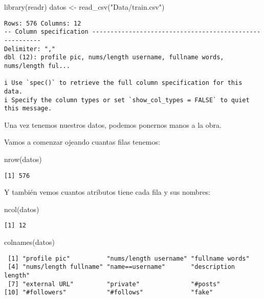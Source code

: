 \documentclass[
  letterpaper,
  DIV=11,
  numbers=noendperiod]{scrreprt}
\newenvironment{Shaded}{\begin{snugshade}}{\end{snugshade}}
\newcommand{\FunctionTok}[1]{\textcolor[rgb]{0.28,0.35,0.67}{#1}}
\newcommand{\NormalTok}[1]{\textcolor[rgb]{0.00,0.23,0.31}{#1}}
\newcommand{\OtherTok}[1]{\textcolor[rgb]{0.00,0.23,0.31}{#1}}
\newcommand{\StringTok}[1]{\textcolor[rgb]{0.13,0.47,0.30}{#1}}
\begin{document}
\begin{Shaded}
\begin{Highlighting}[]
\FunctionTok{library}\NormalTok{(readr) }
\NormalTok{datos }\OtherTok{\textless{}{-}} \FunctionTok{read\_csv}\NormalTok{(}\StringTok{"Data/train.csv"}\NormalTok{) }
\end{Highlighting}
\end{Shaded}

\begin{verbatim}
Rows: 576 Columns: 12
-- Column specification --------------------------------------------------------
Delimiter: ","
dbl (12): profile pic, nums/length username, fullname words, nums/length ful...

i Use `spec()` to retrieve the full column specification for this data.
i Specify the column types or set `show_col_types = FALSE` to quiet this message.
\end{verbatim}

Una vez tenemos nuestros datos, podemos ponernos manos a la obra.

Vamos a comenzar ojeando cuantas filas tenemos:

\begin{Shaded}
\begin{Highlighting}[]
\FunctionTok{nrow}\NormalTok{(datos)}
\end{Highlighting}
\end{Shaded}

\begin{verbatim}
[1] 576
\end{verbatim}

Y también vemos cuantos atributos tiene cada fila y sus nombres:

\begin{Shaded}
\begin{Highlighting}[]
\FunctionTok{ncol}\NormalTok{(datos)  }
\end{Highlighting}
\end{Shaded}

\begin{verbatim}
[1] 12
\end{verbatim}

\begin{Shaded}
\begin{Highlighting}[]
\FunctionTok{colnames}\NormalTok{(datos)}
\end{Highlighting}
\end{Shaded}

\begin{verbatim}
 [1] "profile pic"          "nums/length username" "fullname words"      
 [4] "nums/length fullname" "name==username"       "description length"  
 [7] "external URL"         "private"              "#posts"              
[10] "#followers"           "#follows"             "fake"                
\end{verbatim}
\end{document}
